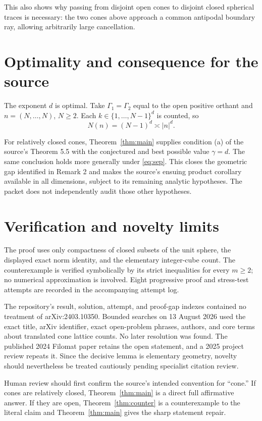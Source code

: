 \documentclass[11pt]{article}
\begin{document}
This also shows why passing from disjoint open cones to disjoint closed
spherical traces is necessary: the two cones above approach a common
antipodal boundary ray, allowing arbitrarily large cancellation.

\section{Optimality and consequence for the source}

The exponent $d$ is optimal.  Take $\Gamma_1=\Gamma_2$ equal to the open
positive orthant and $n=(N,\ldots,N)$, $N\ge2$.  Each
$k\in\{1,\ldots,N-1\}^d$ is counted, so
\[
 N(n)=(N-1)^d\asymp |n|^d.
\]

For relatively closed cones, Theorem~\ref{thm:main} supplies condition (a) of
the source's Theorem 5.5 with the conjectured and best possible value
$\gamma=d$.  The same conclusion holds more generally under
\eqref{eq:sep}.  This closes the geometric gap identified in Remark 2 and
makes the source's ensuing product corollary available in all dimensions,
subject to its remaining analytic hypotheses.  The packet does not
independently audit those other hypotheses.

\section{Verification and novelty limits}

The proof uses only compactness of closed subsets of the unit sphere, the
displayed exact norm identity, and the elementary integer-cube count.  The
counterexample is verified symbolically by its strict inequalities for every
$m\ge2$; no numerical approximation is involved.  Eight progressive proof
and stress-test attempts are recorded in the accompanying attempt log.

The repository's result, solution, attempt, and proof-gap indexes contained no
treatment of arXiv:2403.10350.  Bounded searches on 13 August 2026 used the
exact title, arXiv identifier, exact open-problem phrases, authors, and core
terms about translated cone lattice counts.  No later resolution was found.
The published 2024 Filomat paper retains the open statement, and a 2025
project review repeats it.  Since the decisive lemma is elementary geometry,
novelty should nevertheless be treated cautiously pending specialist citation
review.

Human review should first confirm the source's intended convention for
``cone.''  If cones are relatively closed, Theorem~\ref{thm:main} is a direct
full affirmative answer.  If they are open, Theorem~\ref{thm:counter} is a
counterexample to the literal claim and Theorem~\ref{thm:main} gives the sharp
statement repair.
\end{document}
